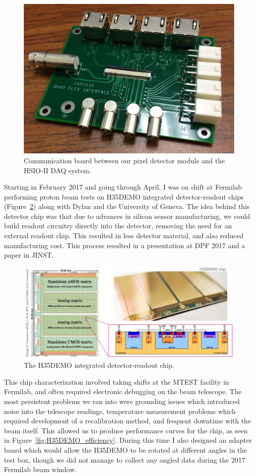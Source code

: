\begin{figure}[htbp]
    \centering
    \includegraphics[width=0.7\linewidth]{Images/Other/adapter_card.JPG}
    \caption{Communication board between our pixel detector module and the HSIO-II DAQ system.}
    \label{fig:adapter_card}
\end{figure}

Starting in February 2017 and going through April, I was on shift at Fermilab performing proton beam tests on H35DEMO integrated detector-readout chips (Figure~\ref{fig:H35DEMO}) along with Dylan and the University of Geneva. The idea behind this detector chip was that due to advances in silicon sensor manufacturing, we could build readout circuitry directly into the detector, removing the need for an external readout chip. This resulted in less detector material, and also reduced manufacturing cost. This process resulted in a presentation at DPF 2017\cite{DPF_H35DEMO} and a paper in JINST\cite{JINST_H35DEMO}.

\begin{figure}[htbp]
    \centering
    \includegraphics[width=\linewidth]{Images/Other/H35DEMO.png}
    \caption{The H35DEMO integrated detector-readout chip.}
    \label{fig:H35DEMO}
\end{figure}

This chip characterization involved taking shifts at the MTEST facility in Fermilab, and often required electronic debugging on the beam telescope. The most persistent problems we ran into were grounding issues which introduced noise into the telescope readings, temperature measurement problems which required development of a recalibration method, and frequent downtime with the beam itself. This allowed us to produce performance curves for the chip, as seen in Figure~\ref{fig:H35DEMO_efficiency}. During this time I also designed an adapter board which would allow the H35DEMO to be rotated at different angles in the test box, though we did not manage to collect any angled data during the 2017 Fermilab beam window.

